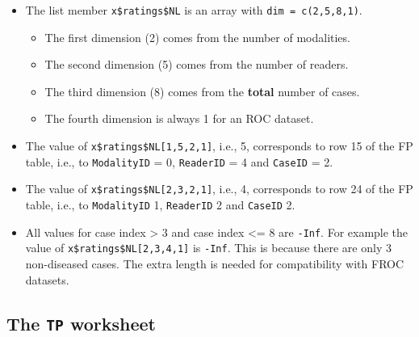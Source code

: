 \documentclass[
]{book}
\providecommand{\tightlist}{%
  \setlength{\itemsep}{0pt}\setlength{\parskip}{0pt}}
\begin{document}
\begin{itemize}
\tightlist
\item
  The list member \texttt{x\$ratings\$NL} is an array with \texttt{dim\ =\ c(2,5,8,1)}.

  \begin{itemize}
  \tightlist
  \item
    The first dimension (2) comes from the number of modalities.
  \item
    The second dimension (5) comes from the number of readers.
  \item
    The third dimension (8) comes from the \textbf{total} number of cases.
  \item
    The fourth dimension is always 1 for an ROC dataset.
  \end{itemize}
\item
  The value of \texttt{x\$ratings\$NL{[}1,5,2,1{]}}, i.e., 5, corresponds to row 15 of the FP table, i.e., to \texttt{ModalityID} = 0, \texttt{ReaderID} = 4 and \texttt{CaseID} = 2.
\item
  The value of \texttt{x\$ratings\$NL{[}2,3,2,1{]}}, i.e., 4, corresponds to row 24 of the FP table, i.e., to \texttt{ModalityID} 1, \texttt{ReaderID} 2 and \texttt{CaseID} 2.
\item
  All values for case index \textgreater{} 3 and case index \textless= 8 are \texttt{-Inf}. For example the value of \texttt{x\$ratings\$NL{[}2,3,4,1{]}} is \texttt{-Inf}. This is because there are only 3 non-diseased cases. The extra length is needed for compatibility with FROC datasets.
\end{itemize}

\hypertarget{dataset-object-details-read-datafile-correspondence-ll-tp}{%
\subsection{\texorpdfstring{The \texttt{TP} worksheet}{The TP worksheet}}\label{dataset-object-details-read-datafile-correspondence-ll-tp}}
\end{document}
